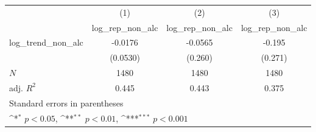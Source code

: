 {
\def\sym#1{\ifmmode^{#1}\else\(^{#1}\)\fi}
\begin{tabular}{l*{3}{c}}
\hline\hline
            &\multicolumn{1}{c}{(1)}&\multicolumn{1}{c}{(2)}&\multicolumn{1}{c}{(3)}\\
            &\multicolumn{1}{c}{log\_rep\_non\_alc}&\multicolumn{1}{c}{log\_rep\_non\_alc}&\multicolumn{1}{c}{log\_rep\_non\_alc}\\
\hline
log\_trend\_non\_alc&     -0.0176         &     -0.0565         &      -0.195         \\
            &    (0.0530)         &     (0.260)         &     (0.271)         \\
\hline
\(N\)       &        1480         &        1480         &        1480         \\
adj. \(R^{2}\)&       0.445         &       0.443         &       0.375         \\
\hline\hline
\multicolumn{4}{l}{\footnotesize Standard errors in parentheses}\\
\multicolumn{4}{l}{\footnotesize \sym{*} \(p<0.05\), \sym{**} \(p<0.01\), \sym{***} \(p<0.001\)}\\
\end{tabular}
}
